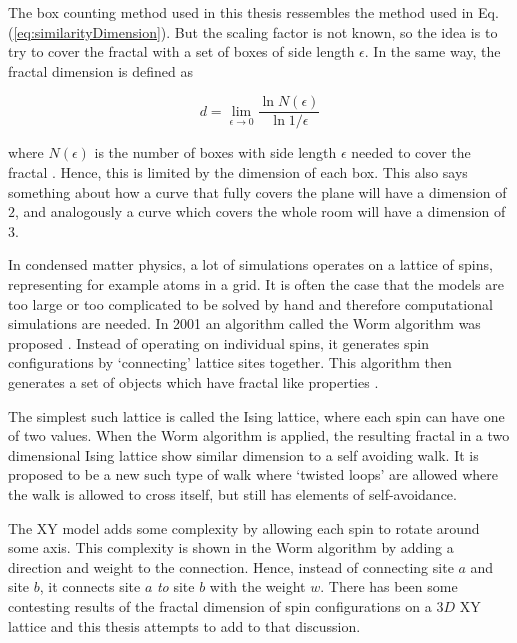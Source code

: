 The box counting method used in this thesis ressembles the method used in Eq. (\ref{eq:similarityDimension}). But the scaling factor is not known, so the idea is to try to cover the fractal with a set of boxes of side length $\epsilon$. In the same way, the fractal dimension is defined as 

\begin{equation}
    d = \lim_{\epsilon \to 0} \frac{\ln N(\epsilon)}{\ln 1 / \epsilon}
\end{equation}

where $N(\epsilon)$ is the number of boxes with side length $\epsilon$ needed to cover the fractal \cite{strogatz:dynamics_chaos}. Hence, this is limited by the dimension of each box. This also says something about how a curve that fully covers the plane will have a dimension of $2$, and analogously a curve which covers the whole room will have a dimension of $3$.

In condensed matter physics, a lot of simulations operates on a lattice of spins, representing for example atoms in a grid. It is often the case that the models are too large or too complicated to be solved by hand and therefore computational simulations are needed. In 2001 an algorithm called the Worm algorithm was proposed \cite{Prokofev:first_worm_algorithm}. Instead of operating on individual spins, it generates spin configurations by `connecting' lattice sites together. This algorithm then generates a set of objects which have fractal like properties \cite{Duplantier:GeoHausdorff}. 

The simplest such lattice is called the Ising lattice, where each spin can have one of two values. When the Worm algorithm is applied, the resulting fractal in a two dimensional Ising lattice show similar dimension to a self avoiding walk. It is proposed to be a new such type of walk where `twisted loops' are allowed where the walk is allowed to cross itself, but still has elements of self-avoidance.

The XY model adds some complexity by allowing each spin to rotate around some axis. This complexity is shown in the Worm algorithm by adding a direction and weight to the connection. Hence, instead of connecting site $a$ and site $b$, it connects site $a$ \textit{to} site $b$ with the weight $w$. There has been some contesting results of the fractal dimension of spin configurations on a $3D$ XY lattice \cite{Prokofev:comment_on_hove_hausdorff_crit_fluct}\cite{Hove:hausdorff_crit_fluctuations} and this thesis attempts to add to that discussion. 













